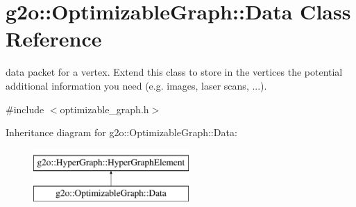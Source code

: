 \hypertarget{classg2o_1_1_optimizable_graph_1_1_data}{}\section{g2o\+:\+:Optimizable\+Graph\+:\+:Data Class Reference}
\label{classg2o_1_1_optimizable_graph_1_1_data}


data packet for a vertex. Extend this class to store in the vertices the potential additional information you need (e.\+g. images, laser scans, ...).  




{\ttfamily \#include $<$optimizable\+\_\+graph.\+h$>$}

Inheritance diagram for g2o\+:\+:Optimizable\+Graph\+:\+:Data\+:\begin{figure}[H]
\begin{center}
\leavevmode
\includegraphics[height=2.000000cm]{classg2o_1_1_optimizable_graph_1_1_data}
\end{center}
\end{figure}
